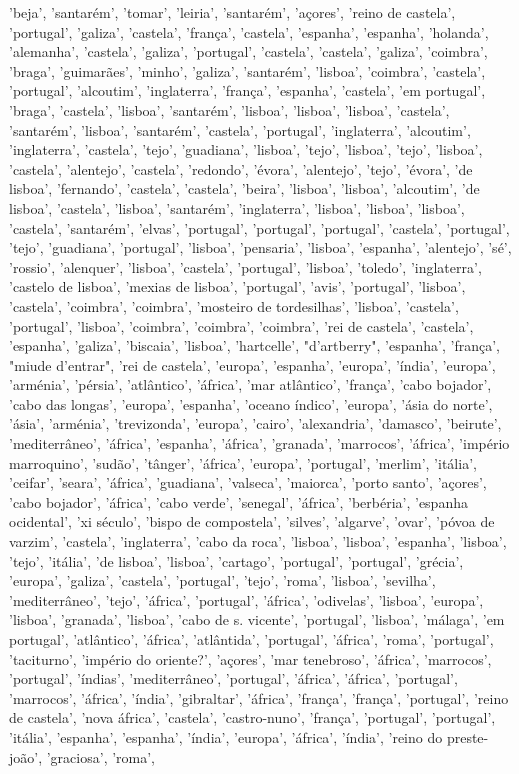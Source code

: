 \documentclass{article}
\begin{document}
\begin{itemize}
'beja', 'santarém', 'tomar', 'leiria', 'santarém', 'açores', 'reino de castela', 'portugal', 'galiza', 'castela', 'frança', 'castela', 'espanha', 'espanha', 'holanda', 'alemanha', 'castela', 'galiza', 'portugal', 'castela', 'castela', 'galiza', 'coimbra', 'braga', 'guimarães', 'minho', 'galiza', 'santarém', 'lisboa', 'coimbra', 'castela', 'portugal', 'alcoutim', 'inglaterra', 'frança', 'espanha', 'castela', 'em portugal', 'braga', 'castela', 'lisboa', 'santarém', 'lisboa', 'lisboa', 'lisboa', 'castela', 'santarém', 'lisboa', 'santarém', 'castela', 'portugal', 'inglaterra', 'alcoutim', 'inglaterra', 'castela', 'tejo', 'guadiana', 'lisboa', 'tejo', 'lisboa', 'tejo', 'lisboa', 'castela', 'alentejo', 'castela', 'redondo', 'évora', 'alentejo', 'tejo', 'évora', 'de lisboa', 'fernando', 'castela', 'castela', 'beira', 'lisboa', 'lisboa', 'alcoutim', 'de lisboa', 'castela', 'lisboa', 'santarém', 'inglaterra', 'lisboa', 'lisboa', 'lisboa', 'castela', 'santarém', 'elvas', 'portugal', 'portugal', 'portugal', 'castela', 'portugal', 'tejo', 'guadiana', 'portugal', 'lisboa', 'pensaria', 'lisboa', 'espanha', 'alentejo', 'sé', 'rossio', 'alenquer', 'lisboa', 'castela', 'portugal', 'lisboa', 'toledo', 'inglaterra', 'castelo de lisboa', 'mexias de lisboa', 'portugal', 'avis', 'portugal', 'lisboa', 'castela', 'coimbra', 'coimbra', 'mosteiro de tordesilhas', 'lisboa', 'castela', 'portugal', 'lisboa', 'coimbra', 'coimbra', 'coimbra', 'rei de castela', 'castela', 'espanha', 'galiza', 'biscaia', 'lisboa', 'hartcelle', "d'artberry", 'espanha', 'frança', "miude d'entrar", 'rei de castela', 'europa', 'espanha', 'europa', 'índia', 'europa', 'arménia', 'pérsia', 'atlântico', 'áfrica', 'mar atlântico', 'frança', 'cabo bojador', 'cabo das longas', 'europa', 'espanha', 'oceano índico', 'europa', 'ásia do norte', 'ásia', 'arménia', 'trevizonda', 'europa', 'cairo', 'alexandria', 'damasco', 'beirute', 'mediterrâneo', 'áfrica', 'espanha', 'áfrica', 'granada', 'marrocos', 'áfrica', 'império marroquino', 'sudão', 'tânger', 'áfrica', 'europa', 'portugal', 'merlim', 'itália', 'ceifar', 'seara', 'áfrica', 'guadiana', 'valseca', 'maiorca', 'porto santo', 'açores', 'cabo bojador', 'áfrica', 'cabo verde', 'senegal', 'áfrica', 'berbéria', 'espanha ocidental', 'xi século', 'bispo de compostela', 'silves', 'algarve', 'ovar', 'póvoa de varzim', 'castela', 'inglaterra', 'cabo da roca', 'lisboa', 'lisboa', 'espanha', 'lisboa', 'tejo', 'itália', 'de lisboa', 'lisboa', 'cartago', 'portugal', 'portugal', 'grécia', 'europa', 'galiza', 'castela', 'portugal', 'tejo', 'roma', 'lisboa', 'sevilha', 'mediterrâneo', 'tejo', 'áfrica', 'portugal', 'áfrica', 'odivelas', 'lisboa', 'europa', 'lisboa', 'granada', 'lisboa', 'cabo de s. vicente', 'portugal', 'lisboa', 'málaga', 'em portugal', 'atlântico', 'áfrica', 'atlântida', 'portugal', 'áfrica', 'roma', 'portugal', 'taciturno', 'império do oriente?', 'açores', 'mar tenebroso', 'áfrica', 'marrocos', 'portugal', 'índias', 'mediterrâneo', 'portugal', 'áfrica', 'áfrica', 'portugal', 'marrocos', 'áfrica', 'índia', 'gibraltar', 'áfrica', 'frança', 'frança', 'portugal', 'reino de castela', 'nova áfrica', 'castela', 'castro-nuno', 'frança', 'portugal', 'portugal', 'itália', 'espanha', 'espanha', 'índia', 'europa', 'áfrica', 'índia', 'reino do preste-joão', 'graciosa', 'roma', 
\end{itemize}
\end{document}
